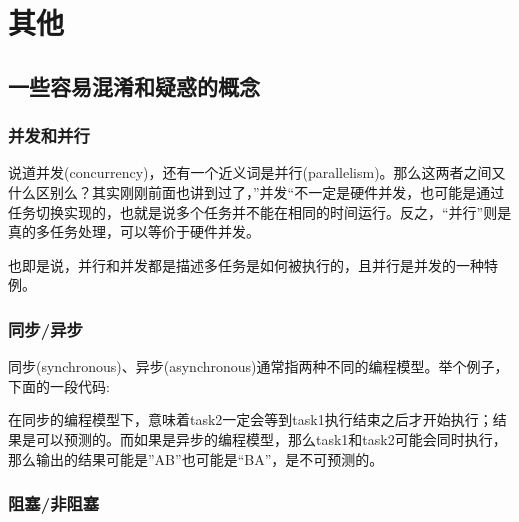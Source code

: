 \documentclass[12pt]{article}
\begin{document}
\section{其他}\label{ux5176ux4ed6}

\subsection{一些容易混淆和疑惑的概念}\label{ux4e00ux4e9bux5bb9ux6613ux6df7ux6dc6ux548cux7591ux60d1ux7684ux6982ux5ff5}

\subsubsection{并发和并行}\label{ux5e76ux53d1ux548cux5e76ux884c}

说道并发(concurrency)，还有一个近义词是并行(parallelism)。那么这两者之间又什么区别么？其实刚刚前面也讲到过了，''并发``不一定是硬件并发，也可能是通过任务切换实现的，也就是说多个任务并不能在相同的时间运行。反之，``并行''则是真的多任务处理，可以等价于硬件并发。

也即是说，并行和并发都是描述多任务是如何被执行的，且并行是并发的一种特例。

\subsubsection{同步/异步}\label{ux540cux6b65ux5f02ux6b65}

同步(synchronous)、异步(asynchronous)通常指两种不同的编程模型。举个例子，下面的一段代码:

\begin{Shaded}
\begin{Highlighting}[]
\NormalTok{() \{ }\NormalTok{(}\NormalTok{) \}}
\NormalTok{() \{ }\NormalTok{(}\NormalTok{) \}}

\NormalTok{() \{}
    \NormalTok{()}
    \NormalTok{()}
\NormalTok{\}}
\end{Highlighting}
\end{Shaded}

在同步的编程模型下，意味着task2一定会等到task1执行结束之后才开始执行；结果是可以预测的。而如果是异步的编程模型，那么task1和task2可能会同时执行，那么输出的结果可能是''AB''也可能是``BA''，是不可预测的。

\subsubsection{阻塞/非阻塞}\label{ux963bux585eux975eux963bux585e}
\end{document}
